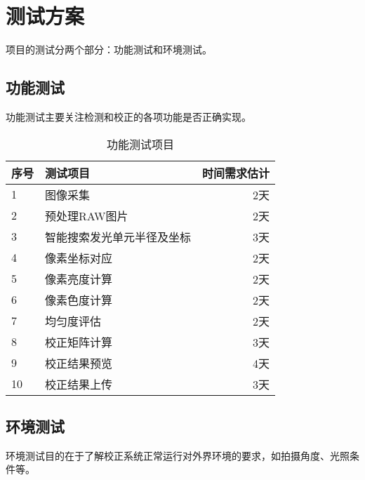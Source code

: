 \section{测试方案}\label{testing}

项目的测试分两个部分：功能测试和环境测试。

\subsection{功能测试}

功能测试主要关注检测和校正的各项功能是否正确实现。

\begin{table}[!h]
\centering
    \begin{tabular}{llr}
    \toprule
    序号      & 测试项目                         & 时间需求估计 \\
    \midrule
    1         & 图像采集                         & 2天          \\
    2         & 预处理RAW图片                    & 2天          \\
    3         & 智能搜索发光单元半径及坐标       & 3天          \\
    4         & 像素坐标对应                     & 2天          \\
    5         & 像素亮度计算                     & 2天          \\
    6         & 像素色度计算                     & 2天          \\
    7         & 均匀度评估                       & 2天          \\
    8         & 校正矩阵计算                     & 3天          \\
    9         & 校正结果预览                     & 4天          \\
    10        & 校正结果上传                     & 3天          \\
    \bottomrule
    \end{tabular}
    \caption{功能测试项目}
    \label{tab:func_test}
\end{table}

\subsection{环境测试}

环境测试目的在于了解校正系统正常运行对外界环境的要求，如拍摄角度、光照条件等。

